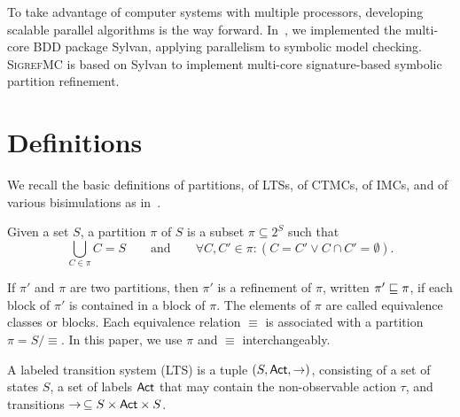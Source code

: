 To take advantage of computer systems with multiple processors,
developing scalable parallel algorithms is the way forward.
In~\cite{DBLP:conf/tacas/DijkP15}, 
we implemented the multi-core BDD package Sylvan, applying parallelism to symbolic model checking.
\textsc{SigrefMC} is based on Sylvan to implement multi-core signature-based symbolic partition refinement.



\section{Definitions}

We recall the basic definitions of partitions, of LTSs, of CTMCs, of IMCs, and of various bisimulations as in~\cite{DBLP:journals/entcs/BlomO03,DBLP:conf/fmco/HermannsK09,DBLP:conf/glvlsi/WimmerHB07,DBLP:conf/atva/WimmerHHSB06,atr16}.





\begin{definition}
Given a set $S$, a partition $\pi$ of $S$ is a subset $\pi\subseteq 2^S$ such that
$$\bigcup_{C\in \pi} C=S \qquad \text{and}\qquad \forall C,C'\in \pi\colon (C=C'\vee C\cap C'=\emptyset).$$
\end{definition}

If $\pi'$ and $\pi$ are two partitions, then $\pi'$ is a refinement of $\pi$, written $\pi'\sqsubseteq \pi$, 
if each block of $\pi'$ is contained in a block of $\pi$.
%
%
The elements of $\pi$ are called equivalence classes or blocks.
%
Each equivalence relation $\equiv$ is associated with a partition $\pi=S/\!\equiv$.
In this paper, we use $\pi$ and $\equiv$ interchangeably.
%




\begin{definition}
A labeled transition system (LTS) is a tuple $(S,\textsf{Act},\rightarrow)$, consisting of a set of states $S$, a set of labels $\textsf{Act}$ that may contain the non-observable action $\tau$, and transitions $\rightarrow\,\subseteq S\times\textsf{Act}\times S$.
\end{definition}

